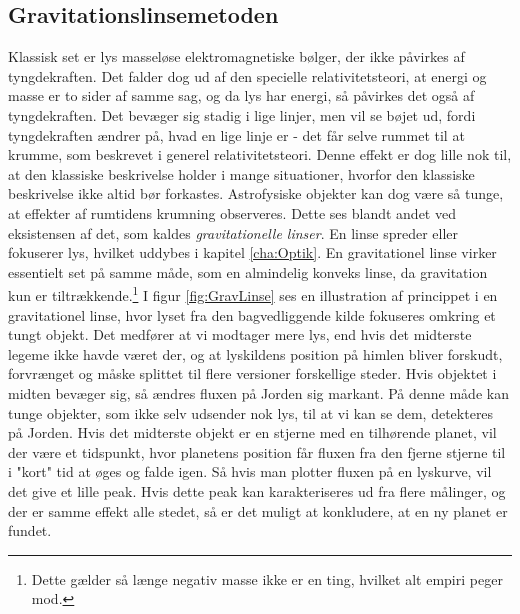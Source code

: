 \subsection*{Gravitationslinsemetoden} \label{sec:GravLinse}
Klassisk set er lys masseløse elektromagnetiske bølger, der ikke påvirkes af tyngdekraften. Det falder dog ud af den specielle relativitetsteori, at energi og masse er to sider af samme sag, og da lys har energi, så påvirkes det også af tyngdekraften. Det bevæger sig stadig i lige linjer, men vil se bøjet ud, fordi tyngdekraften ændrer på, hvad en lige linje er - det får selve rummet til at krumme, som beskrevet i generel relativitetsteori. Denne effekt er dog lille nok til, at den klassiske beskrivelse holder i mange situationer, hvorfor den klassiske beskrivelse ikke altid bør forkastes. Astrofysiske objekter kan dog være så tunge, at effekter af rumtidens krumning observeres. Dette ses blandt andet ved eksistensen af det, som kaldes \textit{gravitationelle linser}. En linse spreder eller fokuserer lys, hvilket uddybes i kapitel \ref{cha:Optik}. En gravitationel linse virker essentielt set på samme måde, som en almindelig konveks linse, da gravitation kun er tiltrækkende.\footnote{Dette gælder så længe negativ masse ikke er en ting, hvilket alt empiri peger mod.} I figur \ref{fig:GravLinse} ses en illustration af princippet i en gravitationel linse, hvor lyset fra den bagvedliggende kilde fokuseres omkring et tungt objekt. Det medfører at vi modtager mere lys, end hvis det midterste legeme ikke havde været der, og at lyskildens position på himlen bliver forskudt, forvrænget og måske splittet til flere versioner forskellige steder. Hvis objektet i midten bevæger sig, så ændres fluxen på Jorden sig markant. På denne måde kan tunge objekter, som ikke selv udsender nok lys, til at vi kan se dem, detekteres på Jorden. Hvis det midterste objekt er en stjerne med en tilhørende planet, vil der være et tidspunkt, hvor planetens position får fluxen fra den fjerne stjerne til i "kort"  tid at øges og falde igen. Så hvis man plotter fluxen på en lyskurve, vil det give et lille peak. Hvis dette peak kan karakteriseres ud fra flere målinger, og der er samme effekt alle stedet, så er det muligt at konkludere, at en ny planet er fundet. \\

